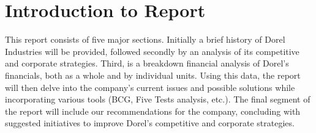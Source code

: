 
\begingroup


\chapter*{Introduction to Report}


This report consists of five major sections.  Initially a brief history of Dorel Industries will be provided, followed secondly by an analysis of its competitive and corporate strategies.  Third, is a breakdown financial analysis of Dorel’s financials, both as a whole and by individual units.  Using this data, the report will then delve into the company’s current issues and possible solutions while incorporating various tools (BCG, Five Tests analysis, etc.).  The final segment of the report will include our recommendations for the company, concluding with suggested initiatives to improve Dorel’s competitive and corporate strategies.


\endgroup



